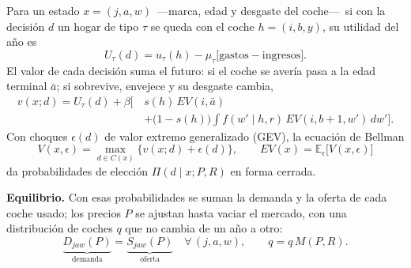 \documentclass[border=0pt]{standalone}
\begin{document}
\begin{minipage}{26.783cm}\fontsize{27}{33.5}\selectfont\raggedright 
Para un estado $x=(j,a,w)$ \,---marca, edad y desgaste del coche---\, si con la
decisión $d$ un hogar de tipo $\tau$ se queda con el coche $h=(i,b,y)$, su utilidad
del año es
\[ U_\tau(d)=u_\tau(h)-\mu_\tau\Big[\text{gastos}-\text{ingresos}\Big]. \]
El valor de cada decisión suma el futuro: si el coche se avería pasa a la edad
terminal $\bar a$; si sobrevive, envejece y su desgaste cambia,
\[ \begin{aligned} v(x;d)=U_\tau(d)+\beta\Big[\,&s(h)\,EV(i,\bar a)\\
   &+\big(1-s(h)\big)\!\int\! f(w'\mid h,r)\,EV(i,b{+}1,w')\,dw'\Big]. \end{aligned} \]
Con choques $\epsilon(d)$ de valor extremo generalizado (GEV), la ecuación de Bellman
\[ V(x,\epsilon)=\max_{d\in C(x)}\Big\{v(x;d)+\epsilon(d)\Big\},\qquad
   EV(x)=\mathbb{E}_\epsilon\Big[V(x,\epsilon)\Big] \]
da probabilidades de elección $\Pi(d\mid x;P,R)$ en forma cerrada.

\textbf{Equilibrio.} Con esas probabilidades se suman la demanda y la oferta de cada
coche usado; los precios $P$ se ajustan hasta vaciar el mercado, con una
distribución de coches $q$ que no cambia de un año a otro:
\[ \underbrace{D_{jaw}(P)}_{\text{demanda}}=\underbrace{S_{jaw}(P)}_{\text{oferta}}
   \quad\forall\,(j,a,w),\qquad q=q\,M(P,R). \]
\end{minipage}
\end{document}
